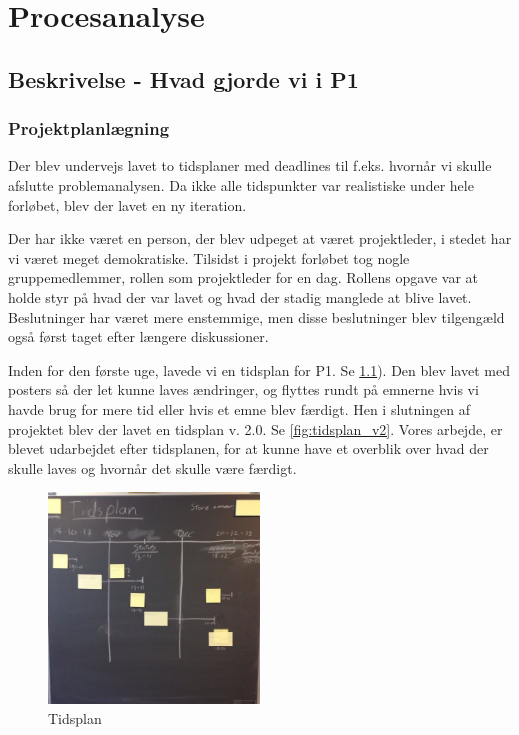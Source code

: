 \documentclass[a4paper,12pt,oneside,article]{memoir}
\begin{document}
\chapter{Procesanalyse}

    \section{Beskrivelse - Hvad gjorde vi i P1} 

        \subsection{Projektplanlægning}

        Der blev undervejs lavet to tidsplaner med deadlines til f.eks. hvornår vi skulle afslutte problemanalysen. Da ikke alle tidspunkter var realistiske under hele forløbet, blev der lavet en ny iteration.
  
        Der har ikke været en person, der blev udpeget at været projektleder, i stedet har vi været meget demokratiske. Tilsidst i projekt forløbet tog nogle gruppemedlemmer, rollen som projektleder for en dag. Rollens opgave var at holde styr på hvad der var lavet og hvad der stadig manglede at blive lavet. Beslutninger har været mere enstemmige, men disse beslutninger blev tilgengæld også først taget efter længere diskussioner.


            
            Inden for den første uge, lavede vi en tidsplan for P1. Se \cref{fig:tidsplan}). Den blev lavet med posters så der let kunne laves ændringer, og flyttes rundt på emnerne hvis vi havde brug for mere tid eller hvis et emne blev færdigt. Hen i slutningen af projektet blev der lavet en tidsplan v. 2.0. Se \cref{fig:tidsplan_v2}. Vores arbejde, er blevet udarbejdet  efter tidsplanen, for at kunne have et overblik over hvad der skulle laves og hvornår det skulle være færdigt.

            \begin{figure}[ht!]
                \centering
                \includegraphics[width=0.5\textwidth]{Images/9.jpg}
                \caption{Tidsplan}
                \label{fig:tidsplan}
            \end{figure}
\end{document}
